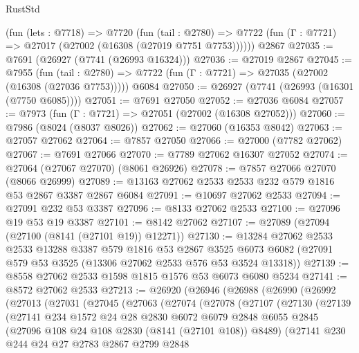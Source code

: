 \begin{lexlean}{RustStd}
\begin{coremodule}
    (fun (lets : @7718) =>
    @7720
      (fun (tail : @2780) =>
      @7722 (fun (Γ : @7721) => @27017 (@27002 (@16308 (@27019 @7751 @7753))))))
    @2867
@27035 := @7691 (@26927 (@7741 (@26993 @16324)))
@27036 := @27019 @2867
@27045 := @7955
    (fun (tail : @2780) => @7722 (fun (Γ : @7721) => @27035 (@27002 (@16308 (@27036 @7753)))))
    @6084
@27050 := @26927 (@7741 (@26993 (@16301 (@7750 @6085))))
@27051 := @7691 @27050
@27052 := @27036 @6084
@27057 := @7973 (fun (Γ : @7721) => @27051 (@27002 (@16308 @27052)))
@27060 := @7986 (@8024 (@8037 @8026))
@27062 := @27060 (@16353 @8042)
@27063 := @27057 @27062
@27064 := @7857 @27050
@27066 := @27000 (@7782 @27062)
@27067 := @7691 @27066
@27070 := @7789 @27062 @16307 @27052
@27074 := @27064 (@27067 @27070) (@8061 @26926)
@27078 := @7857 @27066 @27070 (@8066 @26999)
@27089 := @13163 @27062 @2533 @2533 @232 @579 @1816 @53 @2867 @3387 @2867 @6084
@27091 := @10697 @27062 @2533
@27094 := @27091 @232 @53 @3387
@27096 := @8133 @27062 @2533
@27100 := @27096 @19 @53 @19 @3387
@27101 := @8142 @27062
@27107 := @27089 (@27094 (@27100 (@8141 (@27101 @19)) @12271))
@27130 := @13284
    @27062
    @2533
    @2533
    @13288
    @3387
    @579
    @1816
    @53
    @2867
    @3525
    @6073
    @6082
    (@27091 @579 @53 @3525 (@13306 @27062 @2533 @576 @53 @3524 @13318))
@27139 := @8558 @27062 @2533 @1598 @1815 @1576 @53 @6073 @6080 @5234
@27141 := @8572 @27062 @2533
@27213 := @26920
    (@26946
      (@26988
        (@26990
          (@26992
            (@27013
              (@27031
                (@27045
                  (@27063
                    (@27074
                      (@27078
                        (@27107
                          (@27130
                            (@27139
                              (@27141
                                @234
                                @1572
                                @24
                                @28
                                @2830
                                @6072
                                @6079
                                @2848
                                @6055
                                @2845
                                (@27096 @108 @24 @108 @2830 (@8141 (@27101 @108)) @8489)
                                (@27141
                                  @230
                                  @244
                                  @24
                                  @27
                                  @2783
                                  @2867
                                  @2799
                                  @2848

\end{coremodule}
\end{lexlean}
